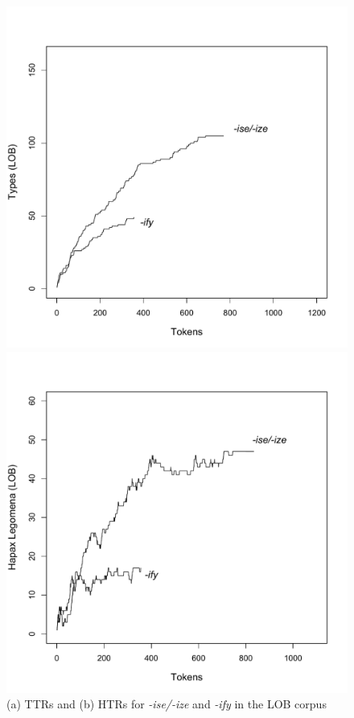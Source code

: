 \begin{figure}
\caption{(a) TTRs and (b) HTRs for \textit{-ise/-ize} and \textit{-ify} in the LOB corpus}
\label{fig:izettrhtr}
\begin{minipage}{.5\textwidth}
 \centering
 \includegraphics[width=\textwidth,trim=0 20 0 55]{figures/lobiseifytypes}
\end{minipage}%
\begin{minipage}{.5\textwidth}
 \centering
 \includegraphics[width=\textwidth,trim=0 20 0 55]{figures/lobiseifyhapaxes}
\end{minipage}
\end{figure}

